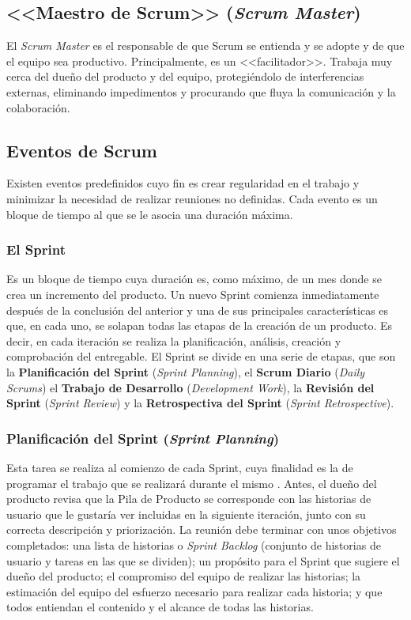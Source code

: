 \subsection*{<<Maestro de Scrum>> (\textit{Scrum Master})}
El \textit{Scrum Master} \cite{Gomez2017} es el responsable de que Scrum se entienda y se adopte y de que el equipo sea productivo. Principalmente, es un <<facilitador>>. Trabaja muy cerca del dueño del producto y del equipo, protegiéndolo de interferencias externas, eliminando impedimentos y procurando que fluya la comunicación y la colaboración.

\subsection{Eventos de Scrum}
Existen eventos \cite{Schwaber2017} predefinidos cuyo fin es crear regularidad en el trabajo y minimizar la necesidad de realizar reuniones no definidas. Cada evento es un bloque de tiempo al que se le asocia una duración máxima.

\newpage

\subsubsection{El Sprint}
Es un bloque de tiempo cuya duración es, como máximo, de un mes donde se crea un incremento del producto. Un nuevo Sprint comienza inmediatamente después de la conclusión del anterior y una de sus principales características es que, en cada uno, se solapan todas las etapas de la creación de un producto. Es decir, en cada iteración se realiza la planificación, análisis, creación y comprobación del entregable. El Sprint se divide en una serie de etapas, que son la \textbf{Planificación del Sprint} (\textit{Sprint Planning}), el \textbf{Scrum Diario} (\textit{Daily Scrums}) el \textbf{Trabajo de Desarrollo} (\textit{Development Work}), la \textbf{Revisión del Sprint} (\textit{Sprint Review}) y la \textbf{Retrospectiva del Sprint} (\textit{Sprint Retrospective}).

\subsubsection{Planificación del Sprint (\textit{Sprint Planning})}
Esta tarea se realiza al comienzo de cada Sprint, cuya finalidad es la de programar el trabajo que se realizará durante el mismo \cite{Gomez2017}. Antes, el dueño del producto revisa que la Pila de Producto se corresponde con las historias de usuario que le gustaría ver incluidas en la siguiente iteración, junto con su correcta descripción y priorización. La reunión debe terminar con unos objetivos completados: una lista de historias o \textit{Sprint Backlog} (conjunto de historias de usuario y tareas en las que se dividen); un propósito para el Sprint que sugiere el dueño del producto; el compromiso del equipo de realizar las historias; la estimación del equipo del esfuerzo necesario para realizar cada historia; y que todos entiendan el contenido y el alcance de todas las historias.

